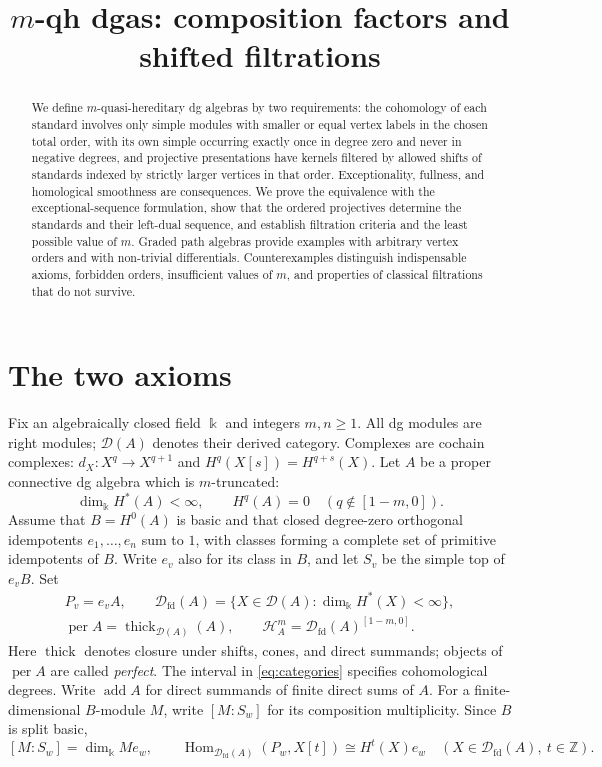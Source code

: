 \documentclass[11pt,a4paper]{article}
\title{$m$-qh dgas: composition factors and shifted filtrations}
\author{}
\date{}
\newcommand{\defn}[1]{\textsl{\color{darkblue} #1}}
\newcommand{\D}{\mathcal D}
\renewcommand{\H}{\mathcal H}
\newcommand{\ZZ}{\mathbb{Z}}
\DeclareMathOperator{\fd}{fd}
\DeclareMathOperator{\Hom}{Hom}
\DeclareMathOperator{\add}{add}
\DeclareMathOperator{\thick}{thick}
\DeclareMathOperator{\per}{per}
\theoremstyle{plain}
\theoremstyle{definition}
\numberwithin{equation}{section}
\begin{document}
\maketitle
\begin{abstract}
We define $m$-quasi-hereditary dg algebras by two requirements:
the cohomology of each standard involves only simple modules with
smaller or equal vertex labels in the chosen total order, with its own
simple occurring exactly once in degree zero and never in negative
degrees, and projective presentations have kernels filtered by allowed
shifts of standards indexed by strictly larger vertices in that order.
Exceptionality, fullness, and homological smoothness
are consequences. We prove the equivalence with the exceptional-sequence
formulation, show that the ordered projectives determine the standards
and their left-dual sequence, and establish filtration criteria and
the least possible value of $m$. Graded path
algebras provide examples with arbitrary vertex orders and with
non-trivial differentials. Counterexamples distinguish indispensable
axioms, forbidden orders, insufficient values of $m$, and properties of
classical filtrations that do not survive.
\end{abstract}

\section{The two axioms}\label{sec:axioms}

Fix an algebraically closed field $\Bbbk$ and integers $m,n\geq1$.
All dg modules are right modules; $\D(A)$ denotes their derived category.
Complexes are cochain complexes:
$d_X:X^q\to X^{q+1}$ and $H^q(X[s])=H^{q+s}(X)$.
Let $A$ be a proper connective dg algebra which is $m$-truncated:
\begin{equation}\label{eq:standing}
 \dim_{\Bbbk}H^*(A)<\infty,\qquad
 H^q(A)=0\quad(q\notin[1-m,0]).
\end{equation}
Assume that $B=H^0(A)$ is basic and that closed degree-zero orthogonal
idempotents $e_1,\ldots,e_n$ sum to $1$, with classes forming a complete
set of primitive idempotents of $B$. Write $e_v$ also for its class in
$B$, and let $S_v$ be the simple top of $e_vB$. Set
\begin{equation}\label{eq:categories}
 \begin{gathered}
 P_v=e_vA,\qquad
 \D_{\fd}(A)=\{X\in\D(A):\dim_{\Bbbk}H^*(X)<\infty\},\\
 \per A=\thick_{\D(A)}(A),\qquad
 \H_A^m=\D_{\fd}(A)^{[1-m,0]}.
 \end{gathered}
\end{equation}
Here $\thick$ denotes closure under shifts, cones, and direct summands;
objects of $\per A$ are called \defn{perfect}. The interval in
\eqref{eq:categories} specifies cohomological degrees.
Write $\add A$ for direct summands of finite direct sums of $A$.
For a finite-dimensional $B$-module $M$, write $[M:S_w]$ for its
composition multiplicity. Since $B$ is split basic,
\begin{equation}\label{eq:projective-cohomology}
 [M:S_w]=\dim_{\Bbbk}Me_w,\qquad
 \Hom_{\D_{\fd}(A)}(P_w,X[t])\cong H^t(X)e_w
 \quad(X\in\D_{\fd}(A),\ t\in\ZZ).
\end{equation}
\end{document}
